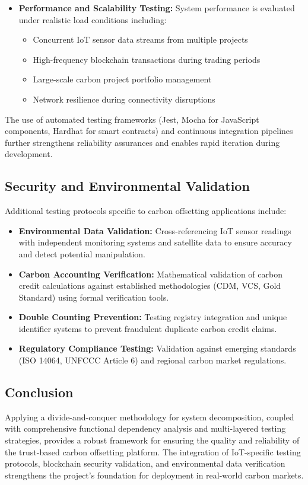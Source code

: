\documentclass[oneside,a4paper,12pt]{book}
\begin{document}
\begin{appendices}
\begin{itemize}[leftmargin=*]
\item \textbf{Performance and Scalability Testing:} System performance is evaluated under realistic load conditions including:
\begin{itemize}
\item Concurrent IoT sensor data streams from multiple projects
\item High-frequency blockchain transactions during trading periods
\item Large-scale carbon project portfolio management
\item Network resilience during connectivity disruptions
\end{itemize}
\end{itemize}

The use of automated testing frameworks (Jest, Mocha for JavaScript components, Hardhat for smart contracts) and continuous integration pipelines further strengthens reliability assurances and enables rapid iteration during development.

\subsection{Security and Environmental Validation}
Additional testing protocols specific to carbon offsetting applications include:

\begin{itemize}[leftmargin=*]
\item \textbf{Environmental Data Validation:} Cross-referencing IoT sensor readings with independent monitoring systems and satellite data to ensure accuracy and detect potential manipulation.

\item \textbf{Carbon Accounting Verification:} Mathematical validation of carbon credit calculations against established methodologies (CDM, VCS, Gold Standard) using formal verification tools.

\item \textbf{Double Counting Prevention:} Testing registry integration and unique identifier systems to prevent fraudulent duplicate carbon credit claims.

\item \textbf{Regulatory Compliance Testing:} Validation against emerging standards (ISO 14064, UNFCCC Article 6) and regional carbon market regulations.
\end{itemize}

\subsection{Conclusion}
Applying a divide-and-conquer methodology for system decomposition, coupled with comprehensive functional dependency analysis and multi-layered testing strategies, provides a robust framework for ensuring the quality and reliability of the trust-based carbon offsetting platform. The integration of IoT-specific testing protocols, blockchain security validation, and environmental data verification strengthens the project's foundation for deployment in real-world carbon markets.


\end{appendices}
\end{document}
